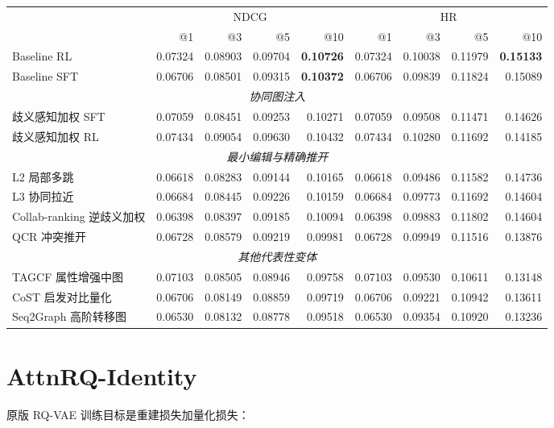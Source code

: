 \documentclass[11pt]{article}
\begin{document}
\begin{center}
\begin{tabular}{lrrrrrrrr}
\toprule
& \multicolumn{4}{c}{NDCG} & \multicolumn{4}{c}{HR} \\
\cmidrule(lr){2-5} \cmidrule(lr){6-9}
& @1 & @3 & @5 & @10 & @1 & @3 & @5 & @10 \\
\midrule
Baseline RL & 0.07324 & 0.08903 & 0.09704 & \textbf{0.10726} & 0.07324 & 0.10038 & 0.11979 & \textbf{0.15133} \\
Baseline SFT & 0.06706 & 0.08501 & 0.09315 & \textbf{0.10372} & 0.06706 & 0.09839 & 0.11824 & 0.15089 \\
\midrule
\multicolumn{9}{c}{\textit{协同图注入}} \\
歧义感知加权 SFT & 0.07059 & 0.08451 & 0.09253 & 0.10271 & 0.07059 & 0.09508 & 0.11471 & 0.14626 \\
歧义感知加权 RL & 0.07434 & 0.09054 & 0.09630 & 0.10432 & 0.07434 & 0.10280 & 0.11692 & 0.14185 \\
\midrule
\multicolumn{9}{c}{\textit{最小编辑与精确推开}} \\
L2 局部多跳 & 0.06618 & 0.08283 & 0.09144 & 0.10165 & 0.06618 & 0.09486 & 0.11582 & 0.14736 \\
L3 协同拉近 & 0.06684 & 0.08445 & 0.09226 & 0.10159 & 0.06684 & 0.09773 & 0.11692 & 0.14604 \\
Collab-ranking 逆歧义加权 & 0.06398 & 0.08397 & 0.09185 & 0.10094 & 0.06398 & 0.09883 & 0.11802 & 0.14604 \\
QCR 冲突推开 & 0.06728 & 0.08579 & 0.09219 & 0.09981 & 0.06728 & 0.09949 & 0.11516 & 0.13876 \\
\midrule
\multicolumn{9}{c}{\textit{其他代表性变体}} \\
TAGCF 属性增强中图 & 0.07103 & 0.08505 & 0.08946 & 0.09758 & 0.07103 & 0.09530 & 0.10611 & 0.13148 \\
CoST 启发对比量化 & 0.06706 & 0.08149 & 0.08859 & 0.09719 & 0.06706 & 0.09221 & 0.10942 & 0.13611 \\
Seq2Graph 高阶转移图 & 0.06530 & 0.08132 & 0.08778 & 0.09518 & 0.06530 & 0.09354 & 0.10920 & 0.13236 \\
\bottomrule
\end{tabular}
\end{center}

\section{AttnRQ-Identity}

原版 RQ-VAE 训练目标是重建损失加量化损失：
\end{document}
